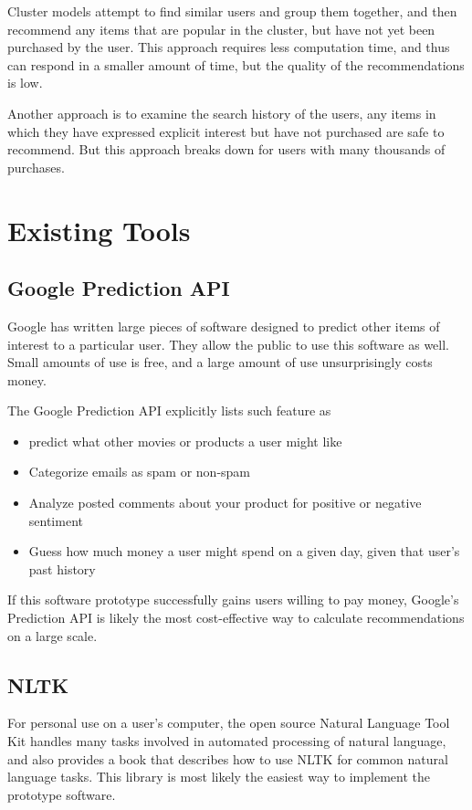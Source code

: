 \documentclass[12pt]{article}
\begin{document}
Cluster models attempt to find similar users and group them together, and then recommend any items that are
popular in the cluster, but have not yet been purchased by the user. This approach requires less computation
time, and thus can respond in a smaller amount of time, but the quality of the recommendations is low.

Another approach is to examine the search history of the users, any items in which they have expressed
explicit interest but have not purchased are safe to recommend. But this approach breaks down for users with
many thousands of purchases.

\section{Existing Tools}
\subsection{Google Prediction API}
Google has written large pieces of software designed to predict other items of interest to a particular
user. They allow the public to use this software as well. Small amounts of use is free, and a large amount of
use unsurprisingly costs money. \cite{GooglePrediction:2013:Online}

The Google Prediction API explicitly lists such feature as
\begin{itemize}
\item predict what other movies or products a user might like
\item Categorize emails as spam or non-spam
\item Analyze posted comments about your product for positive or negative sentiment
\item Guess how much money a user might spend on a given day, given that user's past history
\end{itemize}

If this software prototype successfully gains users willing to pay money, Google's Prediction API is likely
the most cost-effective way to calculate recommendations on a large scale.
\subsection{NLTK}
For personal use on a user's computer, the open source Natural Language Tool Kit handles many tasks involved
in automated processing of natural language, and also provides a book that describes how to use NLTK for
common natural language tasks. This library is most likely the easiest way to implement the prototype
software. \cite{NLTK:2013:Online}
\end{document}
